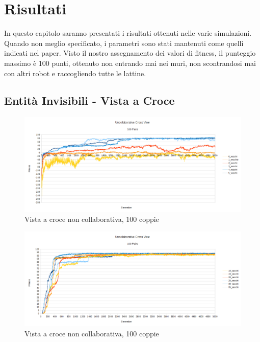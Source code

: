 \chapter{Risultati}
In questo capitolo saranno presentati i risultati ottenuti nelle varie
simulazioni. Quando non meglio specificato, i parametri sono stati mantenuti
come quelli indicati nel paper. Visto il nostro assegnamento dei valori di
fitness, il punteggio massimo è 100 punti, ottenuto non entrando mai nei muri,
non scontrandosi mai con altri robot e raccogliendo tutte le lattine.

\section{Entità Invisibili - Vista a Croce}
\begin{figure}[ht]
	\centering
	\includegraphics[scale=0.7,angle=90]{imgs/uncollaborative_cross_100_pairs_0_5_vecchi.png}
	\caption{Vista a croce non collaborativa, 100 coppie}
	\label{figure:uncoll_cross_100_0_5}
\end{figure}
\begin{figure}[ht]
	\centering
	\includegraphics[scale=0.7,angle=90]{imgs/uncollaborative_cross_100_pairs_10_35_vecchi.png}
	\caption{Vista a croce non collaborativa, 100 coppie}
	\label{figure:uncoll_cross_100_10_35}
\end{figure}
